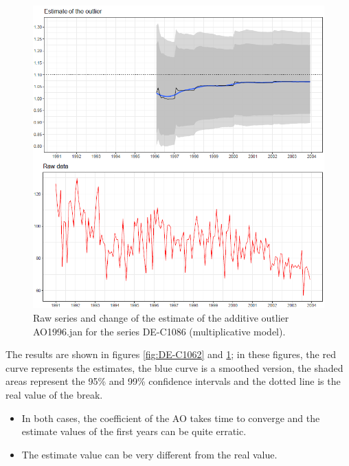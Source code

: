 \documentclass[12pt, a4paper]{article}
\begin{document}
\begin{figure}[!ht]
\begin{center}
 \includegraphics[width=16cm]{img/DE-C1086-EstimateAO.PNG}
 \caption[Raw series and change of the estimate of the additive outlier AO1996.jan for the series DE-C1086 (multiplicative model)]{Raw series and change of the estimate of the additive outlier AO1996.jan for the series DE-C1086 (multiplicative model).}
 \label{fig:DE-C1086}
\end{center}
\end{figure}

The results are shown in figures \ref{fig:DE-C1062} and \ref{fig:DE-C1086}; in these figures, the red curve represents the estimates, the blue curve is a smoothed version, the shaded areas represent the 95\% and 99\% confidence intervals and the dotted line is the real value of the break.
\begin{itemize}
	\item In both cases, the coefficient of the AO takes time to converge and the estimate values of the first years can be quite erratic.
	\item The estimate value can be very different from the real value.
\end{itemize}

\vspace{2mm}
\end{document}
